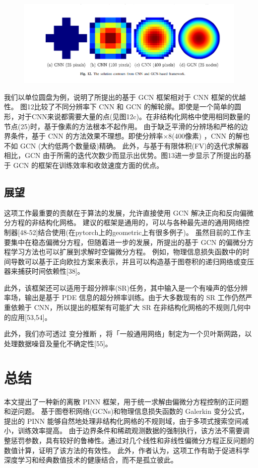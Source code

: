 \begin{figure}[H]  
    \centering  
    \includegraphics[width=\textwidth]{./pics/p12.png}  
\end{figure}

我们以单位圆盘为例，说明了所提出的基于 GCN 框架相对于 CNN 框架的优越性。
图12比较了不同分辨率下 CNN 和 GCN 的解轮廓。即使是一个简单的圆形，对于CNN来说都需要大量的点(见图12c)。在非结构化网格中使用相同数量的节点(25)时，基于像素的方法根本不起作用。
由于缺乏平滑的分辨场和严格的边界条件，基于 CNN 的方法效果不理想。即使分辨率$\times 8$(400像素) ，CNN 的解也不如 GCN (大约低两个数量级)精确。
此外，与基于有限体积(FV)的迭代求解器相比，GCN 由于所需的迭代次数少而显示出优势。图13进一步显示了所提出的基于 GCN 的框架在训练效率和收敛速度方面的优点。
\subsection{展望}
这项工作最重要的贡献在于算法的发展，允许直接使用 GCN 解决正向和反向偏微分方程的非结构化网格。
建议的框架是通用的，可以与各种最先进的通用网络控制器[48-52]结合使用(在pytorch上的geometric上有很多例子)。
虽然目前的工作主要集中在稳态偏微分方程，但随着进一步的发展，所提出的基于 GCN 的偏微分方程学习方法也可以扩展到求解时空偏微分方程。
例如，物理信息损失函数中的时间导数可以基于正向欧拉方案来表示，并且可以构造基于图卷积的递归网络或变压器来捕获时间依赖性[38]。

此外，该框架还可以适用于超分辨率(SR)任务，其中输入是一个有噪声的低分辨率场，输出是基于 PDE 信息的超分辨率训练。由于大多数现有的 SR 工作仍然严重依赖于 CNN，所以提出的框架有可能扩大 SR 在非结构化网格的不规则几何中的应用[53,54]。

此外，我们亦可透过 变分推断 ，将「一般通用网络」制定为一个贝叶斯网路，以处理数据噪音及量化不确定性[55]。

\section{总结}
本文提出了一种新的离散 PINN 框架，用于统一求解由偏微分方程控制的正问题和逆问题。
基于图卷积网络(GCNs)和物理信息损失函数的 Galerkin 变分公式，提出的 PINN 能够自然地处理非结构化网格的不规则域，由于多项式搜索空间减小，训练效率提高。
由于边界条件和稀疏观测数据的强制执行，该方法不需要调整惩罚参数，具有较好的鲁棒性。通过对几个线性和非线性偏微分方程正反问题的数值计算，证明了该方法的有效性。
此外，作者认为，这项工作有助于促进科学深度学习和经典数值技术的健康结合，而不是孤立彼此。


